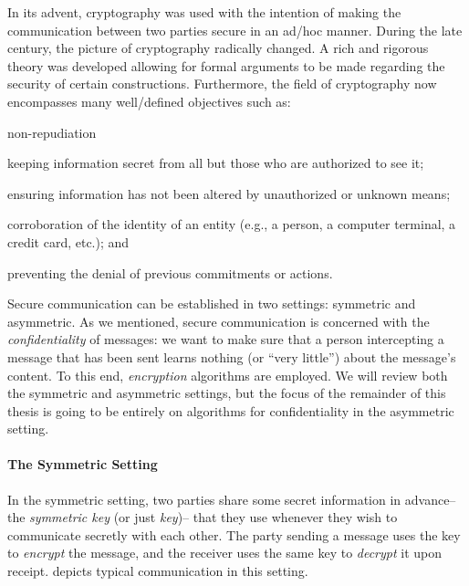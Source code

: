 \documentclass[version=last, paper=A4, parskip=half, oneside]{scrbook}
\theoremstyle{plain}
\theoremstyle{definition}
\theoremstyle{remark}
\begin{document}
In its advent, cryptography was used with the intention of making the
communication between two parties secure in an ad\-/hoc manner.  During the late
 century, the picture of cryptography radically changed.  A rich and
rigorous theory was developed allowing for formal arguments to be made regarding
the security of certain constructions.  Furthermore, the field of cryptography
now encompasses many well\-/defined objectives such as:
\begingroup
{}
\begin{labeling}[~--]{non-repudiation}
\item[confidentiality] keeping information secret from all but those
  who are authorized to see it;
\item[data integrity] ensuring information has not been altered by unauthorized
  or unknown means;
\item[authentication] corroboration of the identity of an entity (e.g., a
  person, a computer terminal, a credit card, etc.); and
\item[non\-/repudiation] preventing the denial of previous commitments or
  actions.
\end{labeling}
\endgroup

Secure communication can be established in two settings: symmetric and
asymmetric.  As we mentioned, secure communication is concerned with the
\emph{confidentiality} of messages: we want to make sure that a person
intercepting a message that has been sent learns nothing (or \enquote{very
  little}) about the message's content.  To this end, \emph{encryption}
algorithms are employed.  We will review both the symmetric and asymmetric
settings, but the focus of the remainder of this thesis is going to be entirely
on algorithms for confidentiality in the asymmetric setting.

\paragraph{The Symmetric Setting} In the symmetric setting, two parties share
some secret information in advance\--- the \emph{symmetric key} (or just
\emph{key})\--- that they use whenever they wish to communicate secretly with
each other.  The party sending a message uses the key to \emph{encrypt} the
message, and the receiver uses the same key to \emph{decrypt} it upon receipt.
 depicts typical communication in this setting.
\end{document}
